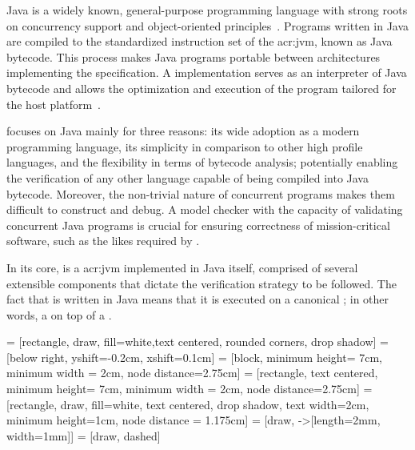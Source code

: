 Java is a widely known, general-purpose programming language with strong roots on concurrency support and object-oriented principles~\cite{Gosling2014}. Programs written in Java are compiled to the standardized instruction set of the \acrfull{acr:jvm}, known as Java bytecode. This process makes Java programs portable between architectures implementing the  specification. A  implementation serves as an interpreter of Java bytecode and allows the optimization and execution of the program tailored for the host platform~\cite{Lindholm2014}.

\jpf focuses on Java mainly for three reasons: its wide adoption as a modern programming language, its simplicity in comparison to other high profile languages, and the flexibility in terms of bytecode analysis; potentially enabling the verification of any other language capable of being compiled into Java bytecode. Moreover, the non-trivial nature of concurrent programs makes them difficult to construct and debug. A model checker with the capacity of validating concurrent Java programs is crucial for ensuring correctness of mission-critical software, such as the likes required by .

In its core, \jpf is a \acrlong{acr:jvm} implemented in Java itself, comprised of several extensible components that dictate the verification strategy to be followed. The fact that \jpf is written in Java means that it is executed on a canonical ; in other words, a  on top of a . 

 = [rectangle, draw, fill=white,text centered, rounded corners, drop shadow]
 = [below right, yshift=-0.2cm, xshift=0.1cm]
 = [block, minimum height= 7cm, minimum width = 2cm, node distance=2.75cm]
 = [rectangle, text centered, minimum height= 7cm, minimum width = 2cm, node distance=2.75cm]
 = [rectangle, draw, fill=white, text centered, drop shadow, text width=2cm, minimum height=1cm, node distance = 1.175cm]
  = [draw, -{>[length=2mm, width=1mm]}]
 = [draw, dashed]

